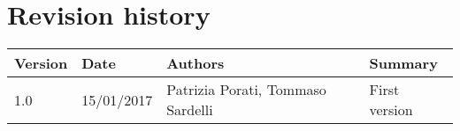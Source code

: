 \pagebreak
\section{Revision history}
\begin{tabular}{|l|l|l|l|}
	\hline
	\textbf{Version}	& \textbf{Date}	& \textbf{Authors}	& \textbf{Summary}\\
	\hline
	1.0 	& 15/01/2017 	& Patrizia Porati, Tommaso Sardelli 	& First version\\
	\hline
\end{tabular}